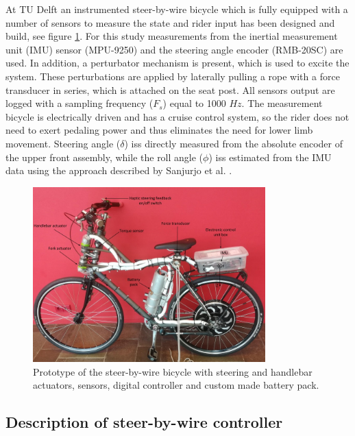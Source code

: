 At TU Delft an instrumented steer-by-wire bicycle which is fully equipped with a number of sensors to measure the state and rider input has been designed and build, see figure \ref{steerbywireprototype}. For this study measurements from the inertial measurement unit (IMU) sensor (MPU-9250) and the steering angle encoder (RMB-20SC) are used. In addition, a perturbator mechanism is present, which is used to excite the system. These perturbations are applied by laterally pulling a rope with a force transducer in series, which is attached on the seat post. All sensors output are logged with a sampling frequency (\(F_s\)) equal to 1000 \(\si{Hz}\). The measurement bicycle is electrically driven and has a cruise control system, so the rider does not need to exert pedaling power and thus eliminates the need for lower limb movement. Steering angle (\(\delta\)) iss directly measured from the absolute encoder of the upper front assembly, while the roll angle (\(\phi\)) iss estimated from the IMU data using the approach described by Sanjurjo et al. \cite{sanjurjo2019roll}.

\begin{figure}[htbp]
\centering
\includegraphics [width=0.8\textwidth]{images/steerbywirebicycle.jpg}
\caption{Prototype of the steer-by-wire bicycle with steering and handlebar actuators, sensors, digital controller and custom made battery pack.}
\label{steerbywireprototype}
\end{figure}

\subsection{Description of steer-by-wire controller} 

